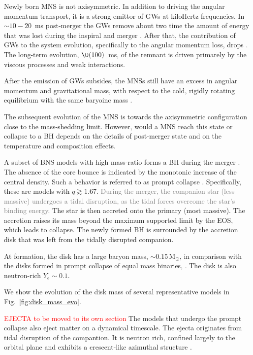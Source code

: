 \documentclass[11pt,a4paper,headinclude=true,DIV=14,BCOR=8mm,chapterprefix,listof=totoc,twoside,openright,abstracton]{scrbook}
\def\Msun{{\text{M}_{\odot}}}
\newcommand{\red}[1]{\textcolor{red}{#1}}
\newcommand{\gray}[1]{\textcolor{gray}{#1}}
\newcommand{\eg}{\textit{e.g.}}
\newcommand{\pmerg}{post-merger}
\begin{document}
Newly born \ac{MNS} is not axisymmetric. In addition to driving the angular 
momentum transport, it is a strong emittor of \acp{GW} at kiloHertz frequencies.
In ${\sim}10-20$~ms \pmerg{} the \acp{GW} remove about two time the 
amount of energy that was lost during the inspiral and merger \citep{Bernuzzi:2015opx}.
After that, the contribution of \acp{GW} to the system evolution, specifically to the angular momentum loss, drops \citep{Radice:2018xqa}. 
The long-term evolution, $\O(100)$~ms, of the remnant is driven primarely by the viscous processes and weak interactions.

After the emission of \acp{GW} subsides, the \acp{MNS} still have an excess in angular momentum and gravitational mass, with respect to the cold, rigidly rotating equilibrium with the same baryoinc mass \citep{Radice:2018xqa}.

The subsequent evolution of the \ac{MNS} is towards the axisymmetric configuration close to the mass-shedding limit. However, would a \ac{MNS} reach this state or collapse to a \ac{BH} depends on the details of \pmerg{} state and on the temperature and composition effects.


A subset of \ac{BNS} models with high mass-ratio forms a \ac{BH} 
during the merger \cite{Bernuzzi:2020txg}. The absence of the core bounce
is indicated by the monotonic increase of the central density.
Such a behavior is referred to as prompt collapse \citep{Radice:2020ddv,Bernuzzi:2020tgt,Bernuzzi:2020txg}.
Specifically, these are models with $q\gtrsim1.67$. 
\gray{During the merger, the companion star (less massive) undergoes a tidal disruption, as the tidal forces overcome the star's binding energy}. The star is then accreted onto the primary (most massive). 
The accretion raises its mass beyond the maximum supported limit by the \ac{EOS}, which leads to collapse. 
The newly formed \ac{BH} is surrounded by the accretion disk that was left from the tidally disrupted companion.

At formation, the disk has a large baryon mass, ${\sim}0.15\,\Msun$, in comparison with the disks formed in prompt collapse of equal mass binaries, \citep[\eg][]{Radice:2018pdn}. 
The disk is also neutron-rich $Y_e\sim 0.1$.

We show the evolution of the disk mass of several representative models in Fig.~\ref{fig:disk_mass_evo}.

\red{EJECTA to be moved to its own section}
The models that undergo the prompt collapse also eject matter on a dynamical timescale. The ejecta originates from tidal disruption of the compantion. It is neutron rich, confined largely to the orbital plane and exhibits a crescent-like azimuthal structure \citep{Bernuzzi:2020txg}.
\end{document}
